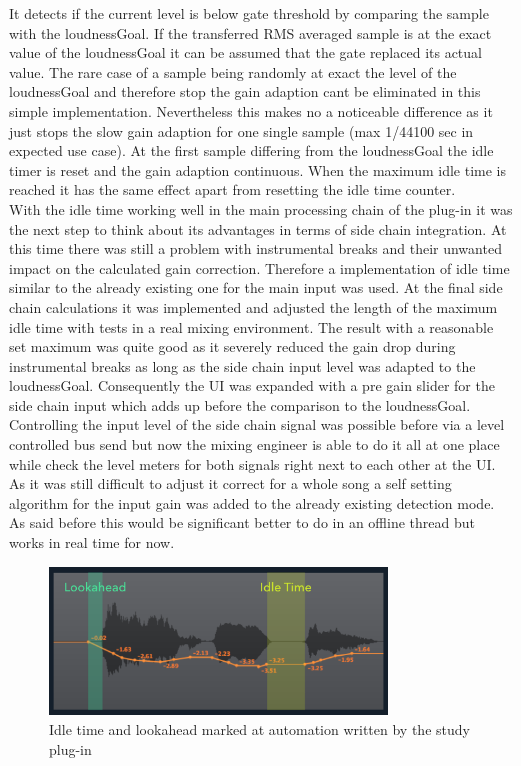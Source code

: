 It detects if the current level is below gate threshold by comparing the sample with the loudnessGoal. If the transferred RMS averaged sample is at the exact value of the loudnessGoal it can be assumed that the gate replaced its actual value. The rare case of a sample being randomly at exact the level of the loudnessGoal and therefore stop the gain adaption cant be eliminated in this simple implementation. Nevertheless this makes no a noticeable difference as it just stops the slow gain adaption for one single sample (max 1/44100 sec in expected use case). At the first sample differing from the loudnessGoal the idle timer is reset and the gain adaption continuous. When the maximum idle time is reached it has the same effect apart from resetting the idle time counter.\\
With the idle time working well in the main processing chain of the plug-in it was the next step to think about its advantages in terms of side chain integration. At this time there was still a problem with instrumental breaks and their unwanted impact on the calculated gain correction. Therefore a implementation of idle time similar to the already existing one for the main input was used. At the final side chain calculations it was implemented and adjusted the length of the maximum idle time with tests in a real mixing environment. The result with a reasonable set maximum was quite good as it severely reduced the gain drop during instrumental breaks as long as the side chain input level was adapted to the loudnessGoal. Consequently the UI was expanded with a pre gain slider for the side chain input which adds up before the comparison to the loudnessGoal. Controlling the input level of the side chain signal was possible before via a level controlled bus send but now the mixing engineer is able to do it all at one place while check the level meters for both signals right next to each other at the UI. As it was still difficult to adjust it correct for a whole song a self setting algorithm for the input gain was added to the already existing detection mode. As said before this would be significant better to do in an offline thread but works in real time for now.\\

\begin{figure}[H]
\includegraphics[width=0.8\textwidth]{images/automation2LookIdle}
	\centering
	\caption{Idle time and lookahead marked at automation written by the study plug-in}
\end{figure}

